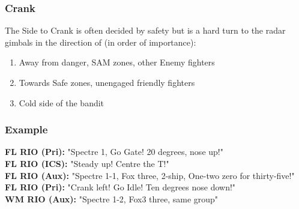 \subsubsection*{Crank}

The Side to Crank is often decided by safety but is a hard turn to the radar
gimbals in the direction of (in order of importance):

\begin{enumerate}
  \item Away from danger, SAM zones, other Enemy fighters
  \item Towards Safe zones, unengaged friendly fighters
  \item Cold side of the bandit
\end{enumerate}


\subsubsection*{Example}

\textbf{FL RIO (Pri):} "Spectre 1, Go Gate! 20 degrees, nose up!" \\
\textbf{FL RIO (ICS):} "Steady up! Centre the T!" \\
\textbf{FL RIO (Aux):} "Spectre 1-1, Fox three, 2-ship, One-two zero for
thirty-five!" \\
\textbf{FL RIO (Pri):} "Crank left! Go Idle! Ten degrees nose down!" \\
\textbf{WM RIO (Aux):} "Spectre 1-2, Fox3 three, same group"


